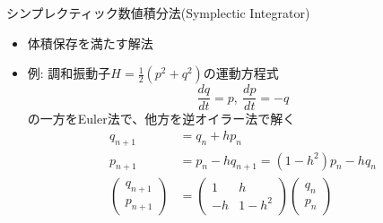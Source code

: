 \begin{frame}[t,fragile]{シンプレクティック数値積分法(Symplectic Integrator)}
  \begin{itemize}
  \item 体積保存を満たす解法
  \item 例: 調和振動子$H=\frac{1}{2}(p^2+q^2)$の運動方程式
    \[
    \frac{dq}{dt} = p, \ \frac{dp}{dt} = -q
    \]
    の一方をEuler法で、他方を逆オイラー法で解く
    \begin{align*}
      q_{n+1} &= q_n + h p_n \\
      p_{n+1} &= p_n - h q_{n+1} = (1-h^2) p_n - h q_n \\
      \begin{pmatrix} q_{n+1} \\ p_{n+1} \end{pmatrix} &= \begin{pmatrix} 1 & h \\ -h & 1-h^2 \end{pmatrix} \begin{pmatrix} q_{n} \\ p_{n} \end{pmatrix}
    \end{align*}
  \end{itemize}
\end{frame}

